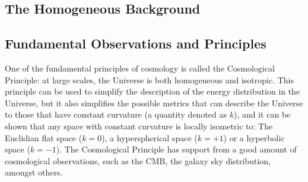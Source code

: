\documentclass[openany,a4paper,12pt,oneside]{book}
\begin{document}
\begin{spacing}{1.5}
\section{The Homogeneous Background}

\subsection{Fundamental Observations and Principles}

One of the fundamental principles of cosmology is called the Cosmological Principle: at large scales, the Universe is both homogeneous and isotropic. This principle can be used to simplify the description of the energy distribution in the Universe, but it also simplifies the possible metrics that can describe the Universe to those that have constant curvature (a quantity denoted as $k$), and it can be shown that any space with constant curvature is locally isometric to: The Euclidian flat space ($k=0$), a hyperspherical space ($k=+1$) or a hyperbolic space ($k=-1$)\cite{choquet2008general}. The Cosmological Principle has support from a good amount of cosmological observations, such as the CMB\cite{COBE}, the galaxy sky distribution\cite{galaxy_isotropy, galaxy_homogeneity_Pandey_2021}, amongst others. 




\end{spacing}
\end{document}
